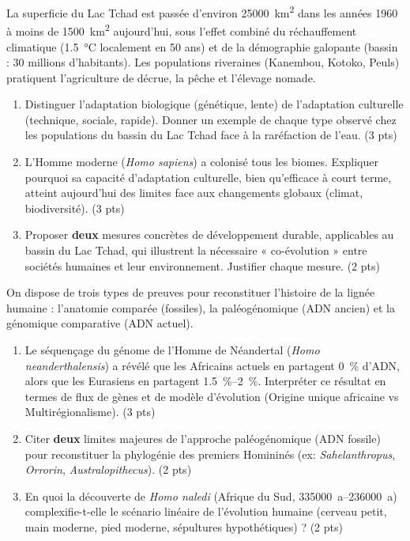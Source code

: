 \documentclass[11pt]{article}
\begin{document}
\begin{exercice}
La superficie du Lac Tchad est passée d'environ \SI{25000}{km^2} dans les années 1960 à moins de \SI{1500}{km^2} aujourd'hui, sous l'effet combiné du réchauffement climatique (\SI{+1.5}{\celsius} localement en 50 ans) et de la démographie galopante (bassin : 30 millions d'habitants). Les populations riveraines (Kanembou, Kotoko, Peuls) pratiquent l'agriculture de décrue, la pêche et l'élevage nomade.

\begin{enumerate}
    \item Distinguer l'adaptation biologique (génétique, lente) de l'adaptation culturelle (technique, sociale, rapide). Donner un exemple de chaque type observé chez les populations du bassin du Lac Tchad face à la raréfaction de l'eau. \hfill (3 pts)
    \item L'Homme moderne (\textit{Homo sapiens}) a colonisé tous les biomes. Expliquer pourquoi sa capacité d'adaptation culturelle, bien qu'efficace à court terme, atteint aujourd'hui des limites face aux changements globaux (climat, biodiversité). \hfill (3 pts)
    \item Proposer \textbf{deux} mesures concrètes de développement durable, applicables au bassin du Lac Tchad, qui illustrent la nécessaire « co-évolution » entre sociétés humaines et leur environnement. Justifier chaque mesure. \hfill (2 pts)
\end{enumerate}
\end{exercice}

\begin{exercice}
On dispose de trois types de preuves pour reconstituer l'histoire de la lignée humaine : l'anatomie comparée (fossiles), la paléogénomique (ADN ancien) et la génomique comparative (ADN actuel).
\begin{enumerate}
    \item Le séquençage du génome de l'Homme de Néandertal (\textit{Homo neanderthalensis}) a révélé que les Africains actuels en partagent \SI{0}{\%} d'ADN, alors que les Eurasiens en partagent \SIrange{1.5}{2}{\%}. Interpréter ce résultat en termes de flux de gènes et de modèle d'évolution (Origine unique africaine vs Multirégionalisme). \hfill (3 pts)
    \item Citer \textbf{deux} limites majeures de l'approche paléogénomique (ADN fossile) pour reconstituer la phylogénie des premiers Homininés (ex: \textit{Sahelanthropus}, \textit{Orrorin}, \textit{Australopithecus}). \hfill (2 pts)
    \item En quoi la découverte de \textit{Homo naledi} (Afrique du Sud, \SIrange{335000}{236000}{a}) complexifie-t-elle le scénario linéaire de l'évolution humaine (cerveau petit, main moderne, pied moderne, sépultures hypothétiques) ? \hfill (2 pts)
\end{enumerate}
\end{exercice}
\end{document}
